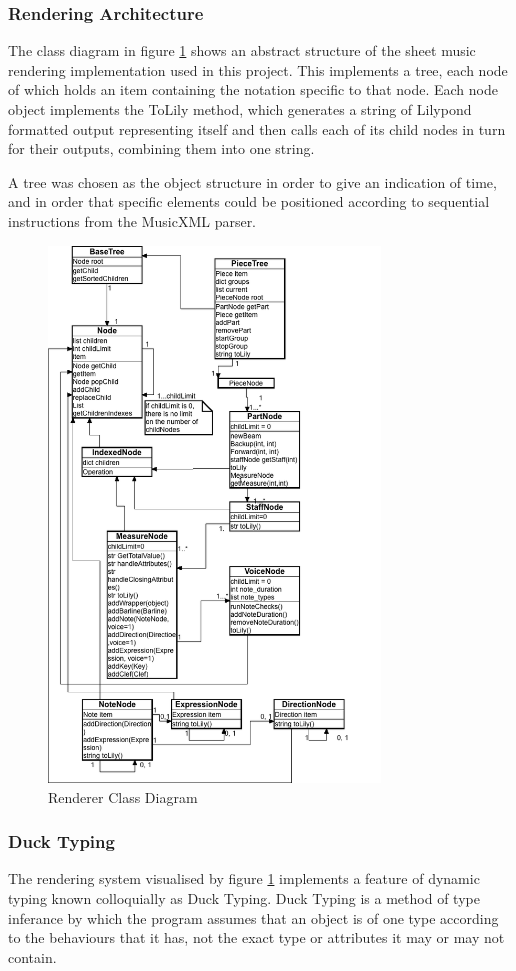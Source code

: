 \subsubsection{Rendering Architecture}
The class diagram in figure \ref{fig:classdiagram} shows an abstract structure of the sheet music rendering implementation used in this project. This implements a tree, each node of which holds an item containing the notation specific to that node. Each node object implements the ToLily method, which generates a string of Lilypond formatted output representing itself and then calls each of its child nodes in turn for their outputs, combining them into one string. 

A tree was chosen as the object structure in order to give an indication of time, and in order that specific elements could be positioned according to sequential instructions from the MusicXML parser. 
\begin{figure}[H]
    \centering
    \includegraphics[width=250pt]{diagrams/render-tree.png}
    \caption{Renderer Class Diagram}
    \label{fig:classdiagram}
\end{figure}
\subsubsection{Duck Typing}
The rendering system visualised by figure \ref{fig:classdiagram} implements a feature of dynamic typing known colloquially as Duck Typing. Duck Typing is a method of type inferance by which the program assumes that an object is of one type according to the behaviours that it has, not the exact type or attributes it may or may not contain. %

